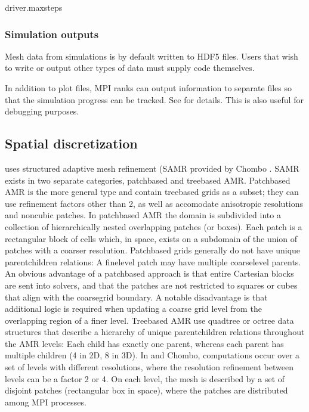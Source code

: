 \documentclass[letterpaper,10pt,english]{sphinxmanual}
\begin{document}
\begin{sphinxVerbatim}[commandchars=\\\{\},formatcom=\scriptsize]
driver.max\PYGZus{}steps  
\end{sphinxVerbatim}


\subsubsection{Simulation outputs}
\label{\detokenize{Model:simulation-outputs}}
Mesh data from  simulations is by default written to HDF5 files.
Users that wish to write or output other types of data must supply code themselves.

In addition to plot files, MPI ranks can output information to separate files so that the simulation progress can be tracked.
See {\hyperref[\detokenize{Control:chap-control}]{}} for details.
This is also useful for debugging purposes.


\subsection{Spatial discretization}
\label{\detokenize{Model:spatial-discretization}}\label{\detokenize{Model:chap-spatialdiscretization}}
 uses structured adaptive mesh refinement (SAMR provided by Chombo .
SAMR exists in two separate categories, patch\sphinxhyphen{}based and tree\sphinxhyphen{}based AMR.
Patch\sphinxhyphen{}based AMR is the more general type and contain tree\sphinxhyphen{}based grids as a subset; they can use refinement factors other than 2, as well as accomodate anisotropic resolutions and non\sphinxhyphen{}cubic patches.
In patch\sphinxhyphen{}based AMR the domain is subdivided into a collection of hierarchically nested overlapping patches (or boxes).
Each patch is a rectangular block of cells which, in space, exists on a subdomain of the union of patches with a coarser resolution.
Patch\sphinxhyphen{}based grids generally do not have unique parent\sphinxhyphen{}children relations: A fine\sphinxhyphen{}level patch may have multiple coarse\sphinxhyphen{}level parents.
An obvious advantage of a patch\sphinxhyphen{}based approach is that entire Cartesian blocks are sent into solvers, and that the patches are not restricted to squares or cubes that align with the coarse\sphinxhyphen{}grid boundary.
A notable disadvantage is that additional logic is required when updating a coarse grid level from the overlapping region of a finer level.
Tree\sphinxhyphen{}based AMR use quadtree or octree data structures that describe a hierarchy of unique parent\sphinxhyphen{}children relations throughout the AMR levels: Each child has exactly one parent, whereas each parent has multiple children (4 in 2D, 8 in 3D).
In  and Chombo, computations occur over a set of levels with different resolutions, where the resolution refinement between levels can be a factor 2 or 4.
On each level, the mesh is described by a set of disjoint patches (rectangular box in space), where the patches are distributed among MPI processes.
\end{document}
